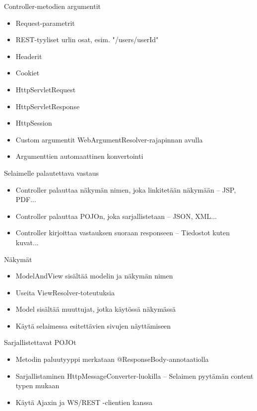 \documentclass[hyperref={pdfauthor=\AUTHOR},14pt]{beamer}
\begin{document}
\begin{frame}[t, fragile]{Controller-metodien argumentit}
\begin{itemize}
\item Request-parametrit
\item REST-tyyliset urlin osat, esim. "/users/{userId}"
\item Headerit
\item Cookiet
\item HttpServletRequest
\item HttpServletResponse
\item HttpSession
\item Custom argumentit WebArgumentResolver-rajapinnan avulla
\item Argumenttien automaattinen konvertointi
\end{itemize}
\end{frame}

\begin{frame}[t, fragile]{Selaimelle palautettava vastaus}
\begin{itemize}
\item Controller palauttaa näkymän nimen, joka linkitetään näkymään
-- JSP, PDF...
\item Controller palauttaa POJOn, joka sarjallistetaan
-- JSON, XML...
\item Controller kirjoittaa vastauksen suoraan responseen
-- Tiedostot kuten kuvat...
\end{itemize}
\end{frame}

\begin{frame}[t, fragile]{Näkymät}
\begin{itemize}
\item ModelAndView sisältää modelin ja näkymän nimen
\item Useita ViewResolver-toteutuksia
\item Model sisältää muuttujat, jotka käytössä näkymässä
\item Käytä selaimessa esitettävien sivujen näyttämiseen
\end{itemize}
\end{frame}

\begin{frame}[t, fragile]{Sarjallistettavat POJOt}
\begin{itemize}
\item Metodin paluutyyppi merkataan @ResponseBody-annotaatiolla
\item Sarjallistaminen HttpMessageConverter-luokilla
-- Selaimen pyytämän content typen mukaan
\item Käytä Ajaxin ja WS/REST -clientien kanssa 
\end{itemize}
\end{frame}
\end{document}
